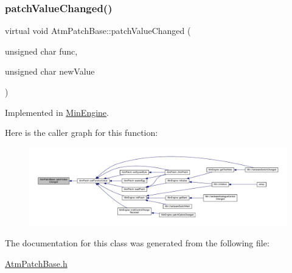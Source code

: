 \subsubsection{\texorpdfstring{patch\+Value\+Changed()}{patchValueChanged()}}
{\footnotesize\ttfamily virtual void Atm\+Patch\+Base\+::patch\+Value\+Changed (\begin{DoxyParamCaption}\item[{unsigned char}]{func,  }\item[{unsigned char}]{new\+Value }\end{DoxyParamCaption})\hspace{0.3cm}{\ttfamily [pure virtual]}}



Implemented in \hyperlink{class_min_engine_a229d4b913277a48909bf1aa01176ae1f}{Min\+Engine}.

Here is the caller graph for this function\+:
\nopagebreak
\begin{figure}[H]
\begin{center}
\leavevmode
\includegraphics[width=350pt]{d4/deb/class_atm_patch_base_ad561145330e0b53990f222c243ef5e89_icgraph}
\end{center}
\end{figure}


The documentation for this class was generated from the following file\+:\begin{DoxyCompactItemize}
\item 
\hyperlink{_atm_patch_base_8h}{Atm\+Patch\+Base.\+h}\end{DoxyCompactItemize}
